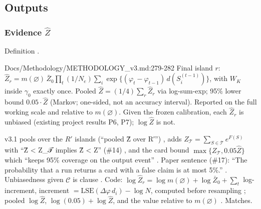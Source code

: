 \subsection{Outputs}\label{sec:method-outputs}

\subsubsection{Evidence \texorpdfstring{$\hat Z$}{Zhat}}
Definition .
\begin{stmt}{Docs/Methodology/METHODOLOGY_v3.md:279-282}
Final island $r$: $\hat Z_r=m(\varnothing)\,\bar Z_0\prod_t(1/N_e)\sum_i\exp\{(\varphi_t-\varphi_{t-1})\,d(S_i^{(t-1)})\}$, with $W_K$ inside
$\gamma_0$ exactly once. Pooled $\hat Z=(1/4)\sum_r\hat Z_r$ via log-sum-exp; 95\% lower bound $0.05\cdot\hat Z$ (Markov; one-sided, not an
accuracy interval). Reported on the full working scale and relative to $m(\varnothing)$. Given the frozen calibration, each $\hat Z_r$
is unbiased (existing project results P6, P7); $\log\hat Z$ is not.
\end{stmt}
v3.1 pools over the $R'$ islands (``pooled Ẑ over R′'') , adds
$Z_{\mathcal T}=\sum_{S\in\mathcal T}e^{F(S)}$ with ``Ẑ < Z\_𝒯 implies Ẑ < Z'' (\#14)
, and the card bound $\max\{Z_{\mathcal T},0.05\hat Z\}$ which ``keeps 95\%
coverage on the output event'' . Paper sentence (\#17): ``The
probability that a run returns a card with a false claim is at most 5\%.'' .
Unbiasedness given $\mathcal C$ is clause . Code: $\log\hat Z_r=\log m(\varnothing)+\log\bar Z_0+\sum_t$ log-increment,
increment $=\mathrm{LSE}(\Delta\varphi\,d_i)-\log N$, computed before resampling
; pooled $\log\hat Z$, $\log(0.05)+\log\hat Z$,
and the value relative to $m(\varnothing)$ . Matches.

